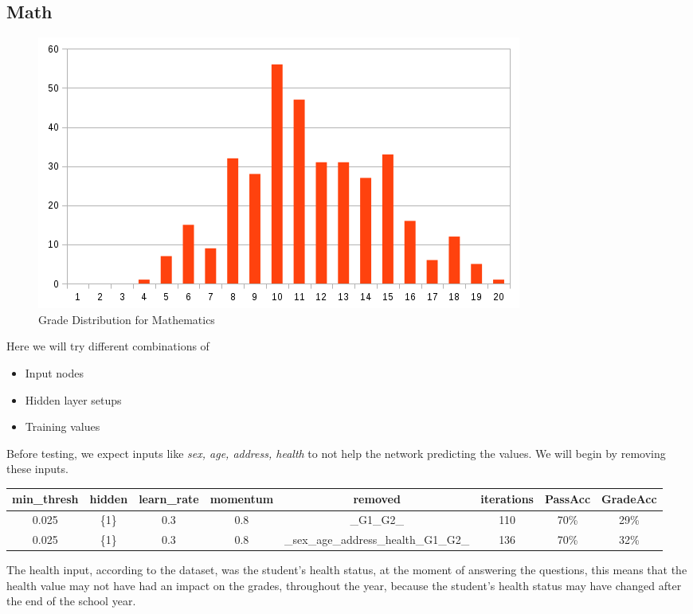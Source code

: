 \documentclass[11pt]{article}
\begin{document}
\subsection{Math}
\begin{figure}[H]
\label{fig:Grade Distribution for Mathematics}
\includegraphics[scale=0.6]{mat-chart.png}
\centering
\caption{Grade Distribution for Mathematics}
\end{figure}
Here we will try different combinations of
\begin{itemize}
\item Input nodes
\item Hidden layer setups
\item Training values
\end{itemize}

Before testing, we expect inputs like \textit{sex, age, address, health} to not help the network predicting the values. We will begin by removing these inputs.


\begin{tabular}{| c | c | c | c | c | c | c | c |}
\hline \textbf{min\_thresh} & \textbf{hidden} & \textbf{learn\_rate} & \textbf{momentum} & \textbf{removed} & \textbf{iterations} & \textbf{PassAcc} & \textbf{GradeAcc}\\
\hline 0.025 & \{1\} & 0.3 & 0.8 & \_G1\_G2\_ & 110 & 70\% & 29\%\\
\hline 0.025 & \{1\} & 0.3 & 0.8 & \_sex\_age\_address\_health\_G1\_G2\_ & 136 & 70\% & 32\%\\
\hline
\end{tabular}

The health input, according to the dataset, was the student's health status, at the moment of answering the questions, this means that the health value may not have had an impact on the grades, throughout the year, because the student's health status may have changed after the end of the school year.
\end{document}

